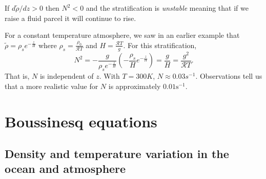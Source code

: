 \documentclass[
  letterpaper,
  twocolumn,
  landscape]{report}
\begin{document}
\begin{tcolorbox}[enhanced jigsaw, toprule=.15mm, left=2mm, opacityback=0, breakable, arc=.35mm, colback=white, rightrule=.15mm, bottomrule=.15mm, colframe=quarto-callout-note-color-frame, leftrule=.75mm]
\begin{minipage}[t]{5.5mm}
\textcolor{quarto-callout-note-color}{\faInfo}
\end{minipage}%
\begin{minipage}[t]{\textwidth - 5.5mm}

If \({d\tilde\rho}/{dz}>0\) then \(N^2<0\) and the stratification is
\emph{unstable} meaning that if we raise a fluid parcel it will continue
to rise.

\end{minipage}%
\end{tcolorbox}

\begin{tcolorbox}[enhanced jigsaw, left=2mm, opacityback=0, coltitle=black, bottomtitle=1mm, title={Example}, toprule=.15mm, colbacktitle=quarto-callout-tip-color!10!white, breakable, arc=.35mm, titlerule=0mm, colback=white, toptitle=1mm, opacitybacktitle=0.6, rightrule=.15mm, bottomrule=.15mm, colframe=quarto-callout-tip-color-frame, leftrule=.75mm]

For a constant temperature atmosphere, we saw in an earlier example that
\(\tilde\rho = \rho_se^{-\frac{z}{H}}\) where
\(\rho_s = \frac{\rho_0}{\mathcal{R}T}\) and
\(H=\frac{\mathcal{R}T}{g}\). For this stratification,
\[ N^2 = -\frac{g}{\rho_se^{-\frac{z}{H}}}\left( -\frac{\rho_s}{H}e^{-\frac{z}{H}}\right) = \frac{g}{H}=\frac{g^2}{\mathcal{R}T}.\]
That is, \(N\) is independent of \(z\). With \(T=300K\),
\(N\approx 0.03s^{-1}\). Observations tell us that a more realistic
value for \(N\) is approximately \(0.01\mathrm{s^{-1}}\).

\end{tcolorbox}

\hypertarget{boussinesq-equations}{%
\section{Boussinesq equations}\label{boussinesq-equations}}

\hypertarget{density-and-temperature-variation-in-the-ocean-and-atmosphere}{%
\subsection{Density and temperature variation in the ocean and
atmosphere}\label{density-and-temperature-variation-in-the-ocean-and-atmosphere}}
\end{document}
